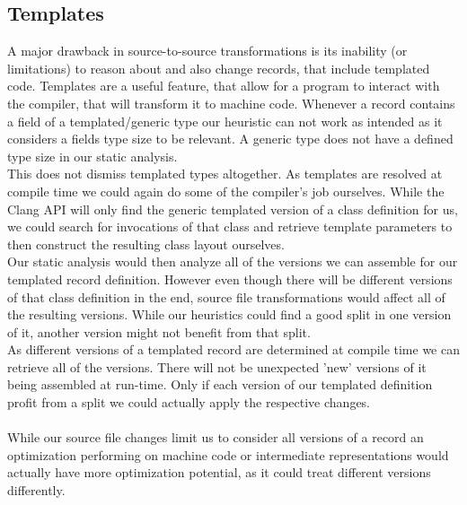 \subsection{Templates}
A major drawback in source-to-source transformations is its inability (or limitations) to reason about and also change records, that include templated code. Templates are a useful feature, that allow for a program to interact with the compiler, that will transform it to machine code. Whenever a record contains a field of a templated/generic type our heuristic can not work as intended as it considers a fields type size to be relevant. A generic type does not have a defined type size in our static analysis.\\
This does not dismiss templated types altogether. As templates are resolved at compile time we could again do some of the compiler's job ourselves. While the Clang API will only find the generic templated version of a class definition for us, we could search for invocations of that class and retrieve template parameters to then construct the resulting class layout ourselves.\\
Our static analysis would then analyze all of the versions we can assemble for our templated record definition. However even though there will be different versions of that class definition in the end, source file transformations would affect all of the resulting versions. While our heuristics could find a good split in one version of it, another version might not benefit from that split.\\
As different versions of a templated record are determined at compile time we can retrieve all of the versions. There will not be unexpected 'new' versions of it being assembled at run-time. Only if each version of our templated definition profit from a split we could actually apply the respective changes.\\\\
While our source file changes limit us to consider all versions of a record an optimization performing on machine code or intermediate representations would actually have more optimization potential, as it could treat different versions differently.

